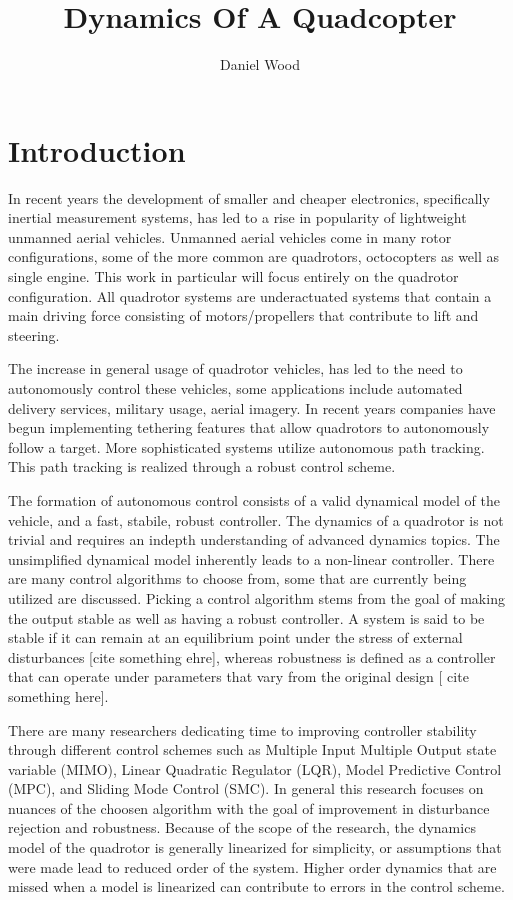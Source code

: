 \documentclass[9pt]{article}
\begin{document}
\title{Dynamics Of A Quadcopter}
\author{Daniel Wood}
\maketitle
\section{Introduction}

In recent years the development of smaller and cheaper electronics, specifically inertial measurement systems, has led to a rise in popularity of lightweight unmanned aerial vehicles. Unmanned aerial vehicles come in many rotor configurations, some of the more common are quadrotors, octocopters as well as single engine. This work in particular will focus entirely on the quadrotor configuration. All quadrotor systems are underactuated systems that contain a main driving force consisting of motors/propellers that contribute to lift and steering. 

The increase in general usage of quadrotor vehicles, has led to the need to autonomously control these vehicles, some applications include automated delivery services, military usage, aerial imagery. In recent years companies have begun implementing tethering features that allow quadrotors to autonomously follow a target. More sophisticated systems utilize autonomous path tracking. This path tracking is realized through a robust control scheme.

The formation of autonomous control consists of a valid dynamical model of the vehicle, and a fast, stabile, robust controller. The dynamics of a quadrotor is not trivial and requires an indepth understanding of advanced dynamics topics. The unsimplified dynamical model inherently leads to a non-linear controller. There are many control algorithms to choose from, some that are currently being utilized are discussed. Picking a control algorithm stems from the goal of making the output stable as well as having a robust controller. A system is said to be stable if it can remain at an equilibrium point under the stress of external disturbances [cite something ehre], whereas robustness is defined as a controller that can operate under parameters that vary from the original design [ cite something here].

There are many researchers dedicating time to improving controller stability through different control schemes such as Multiple Input Multiple Output state variable (MIMO)\cite{FarameeVeeravat2014EotS}, Linear Quadratic Regulator (LQR), Model Predictive Control (MPC), and Sliding Mode Control (SMC). In general this research focuses on nuances of the choosen algorithm with the goal of improvement in disturbance rejection\cite{DenisKotarski2016CDFU} and robustness. Because of the scope of the research, the dynamics model of the quadrotor is generally linearized for simplicity, or assumptions that were made lead to reduced order of the system\cite{FarameeVeeravat2014EotS}. Higher order dynamics that are missed when a model is linearized can contribute to errors in the control scheme. 
\end{document}

